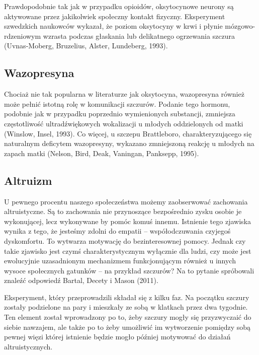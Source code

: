 \documentclass{psychol}
\begin{document}
Prawdopodobnie tak jak w przypadku opioidów, oksytocynowe neurony są aktywowane przez jakikolwiek społeczny kontakt fizyczny. Eksperyment szwedzkich naukowców wykazał, że poziom oksytocyny w krwi i płynie mózgowo-rdzeniowym wzrasta podczas głaskania lub delikatnego ogrzewania szczura (Uvnas-Moberg, Bruzelius, Alster, Lundeberg, 1993).

\subsection{Wazopresyna}

Chociaż nie tak popularna w literaturze jak oksytocyna, wazopresyna również może pełnić istotną rolę w komunikacji szczurów. Podanie tego hormonu, podobnie jak w przypadku poprzednio wymienionych substancji, zmniejsza częstotliwość ultradźwiękowych wokalizacji u młodych oddzielonych od matki (Winslow, Insel, 1993). Co więcej, u szczepu Brattleboro, charakteryzującego się naturalnym deficytem wazopresyny, wykazano zmniejszoną reakcję u młodych na zapach matki (Nelson, Bird, Deak, Vaningan, Panksepp, 1995).


\subsection{Altruizm}

U pewnego procentu naszego społeczeństwa możemy zaobserwować zachowania altruistyczne. Są to zachowania nie przynoszące bezpośrednio zysku osobie je wykonującej, lecz wykonywane by pomóc komuś innemu. Istnienie tego zjawiska wynika z tego, że jesteśmy zdolni do empatii -- współodczuwania czyjegoś dyskomfortu. To wytwarza motywację do bezinteresownej pomocy. Jednak czy takie zjawisko jest czymś charakterystycznym wyłącznie dla ludzi, czy może jest ewolucyjnie uzasadnionym mechanizmem funkcjonującym również u innych wysoce społecznych gatunków -- na przykład szczurów? Na to pytanie spróbowali znaleźć odpowiedź Bartal, Decety i Mason (2011).

Eksperyment, który przeprowadzili składał się z kilku faz. Na początku szczury zostały podzielone na pary i mieszkały ze sobą w klatkach przez dwa tygodnie. Ten element został wprowadzony po to, żeby szczury mogły się przyzwyczaić do siebie nawzajem, ale także po to żeby umożliwić im wytworzenie pomiędzy sobą pewnej więzi której istnienie będzie mogło później motywować do działań altruistycznych.
\end{document}
